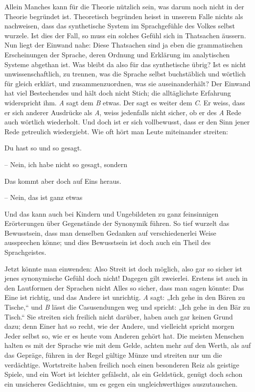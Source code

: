 \largerpage[1]Allein Manches kann für die Theorie nützlich sein, was darum noch nicht in der Theorie begründet ist. Theoretisch begründen heisst in unserem Falle nichts  als nachweisen, dass das synthetische System im Sprachgefühle des Volkes selbst wurzele. Ist dies der Fall, so muss ein solches Gefühl sich in Thatsachen äussern. Nun liegt der Einwand nahe: Diese Thatsachen sind ja eben die grammatischen Erscheinungen der Sprache, deren Ordnung und Erklärung im analytischen Systeme abgethan ist. Was bleibt da also für das synthetische übrig? Ist es nicht unwissenschaftlich, zu trennen, was die Sprache selbst buchstäblich und wörtlich für gleich erklärt, und zusammenzuordnen, was sie  auseinanderhält? Der Einwand hat viel Bestechendes und hält doch nicht Stich; die alltäglichste Erfahrung widerspricht ihm. \label{fp.101} \textit{A} sagt dem \textit{B} etwas. Der sagt es weiter dem \textit{C}. Er weiss, dass er sich anderer Ausdrücke  als \textit{A}, weiss jedenfalls nicht sicher, ob er des \textit{A} Rede auch wörtlich wiederholt. Und doch ist er sich vollbewusst, dass er den Sinn jener Rede getreulich wiedergiebt. Wie oft hört man Leute miteinander streiten:

Du hast so und so gesagt.

– Nein, ich habe nicht so gesagt, sondern 

Das kommt aber doch auf Eins heraus.

– Nein, das ist ganz etwas 

\noindent Und das kann auch bei Kindern und Ungebildeten zu ganz feinsinnigen Erörterungen über Gegenstände der Synonymik führen. So tief wurzelt das Bewusstsein, dass man denselben Gedanken auf verschiedenerlei Weise aussprechen könne; und dies Bewusstsein ist doch auch ein Theil des Sprachgeistes.

Jetzt könnte man einwenden: Also Streit ist doch möglich, also gar so sicher ist jenes synonymische Gefühl doch nicht! Dagegen gilt zweierlei. Erstens ist auch in den Lautformen der Sprachen nicht Alles so sicher, dass man sagen \label{sp.98} könnte: Das Eine ist richtig, und das Andere ist unrichtig. \textit{A} sagt: „Ich gehe in den Bären zu Tische,“ und \textit{B} lässt die Casusendungen weg und spricht: „Ich gehe in den Bär zu Tisch.“ Sie streiten sich freilich nicht darüber, haben auch gar keinen Grund dazu; denn Einer hat so recht, wie der Andere, und vielleicht spricht morgen Jeder selbst so, wie er es heute vom Anderen gehört hat. Die meisten Menschen halten es mit der Sprache wie mit dem Gelde, achten mehr auf den Werth, als auf das Gepräge, führen in der Regel gültige Münze und streiten nur um die verdächtige. Wortstreite haben freilich noch einen besonderen Reiz als geistige Spiele, und ein Wort ist leichter gefälscht, als ein Geldstück, genügt doch schon ein unsicheres Gedächtniss, um es gegen ein ungleichwerthiges auszutauschen.

